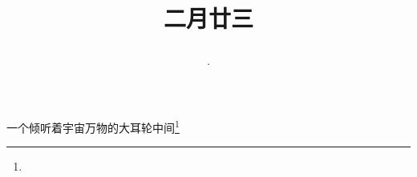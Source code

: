 \title{\date[d=1,m=4,y=2024][year:cn-y,年,month:cn,day:cn,日,·,weekday]·二月廿三 }
一个倾听着宇宙万物的大耳轮中间\footnote{ }

